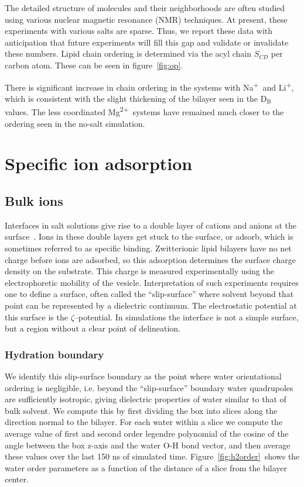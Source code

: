 \documentclass[journal=langd5,manuscript=article]{achemso}
\newcommand{\na}{Na\textsuperscript{+}~}
\newcommand{\mg}{Mg\textsuperscript{2+}~}
\newcommand{\db}{$\text{D}_\text{B}$}
\begin{document}
The detailed structure of molecules and their neighborhoods are often studied using 
various nuclear magnetic resonance (NMR) techniques.
{At present, these experiments with various salts are sparse.}
{Thus,} we report these data with anticipation that future experiments will fill this gap and validate
or invalidate
these numbers.
Lipid chain ordering is determined via the acyl chain $S_{CD}$ per carbon
atom. These can be seen in figure~\ref{fig:op}. 

There is significant increase in chain ordering in the systems 
with \na and Li\textsuperscript{+}, which {is} consistent with the slight thickening
of the bilayer seen in the \db~ values. The less coordinated \mg systems have remained much closer to the 
ordering seen in the no-salt simulation.


\section{Specific ion adsorption}
\subsection{Bulk ions}

Interfaces in salt solutions give rise to a double layer of cations and anions at the surface~\cite{israelachvili:2011:intermol}. 
Ions in these double layers get stuck to the surface, or adsorb, which is sometimes referred to as specific binding. Zwitterionic lipid bilayers have no net charge before ions are adsorbed,
so this adsorption
determines the surface charge density on the substrate. This charge is measured experimentally using the electrophoretic mobility of the vesicle. Interpretation
of such experiments requires one to define a surface, often called the ``slip-surface'' where solvent 
beyond that point
can be represented by a dielectric continuum. The electrostatic potential at this surface is the $\zeta$--potential.
In simulations the interface is not a simple surface, but a region {without a clear point of delineation}. 

\subsubsection{Hydration boundary}
We {identify} this 
slip-surface boundary as the point where 
water orientational ordering is negligible, i.e.
beyond the ``slip-surface'' 
boundary water {quadrupoles} are {sufficiently isotropic,
giving dielectric properties of water similar to that of bulk solvent}.
We compute this by first dividing the box into 
slices along the direction normal to the bilayer. 
For each water within a slice we 
compute the average value of first and second order legendre polynomial of 
the cosine of the angle between the box z-axis and
the water O-H bond vector, and then average these values over the last 150 ns of simulated time.
Figure~\ref{fig:h2order}~shows the water order parameters 
as a function of the distance of a slice from the bilayer center.
\end{document}
